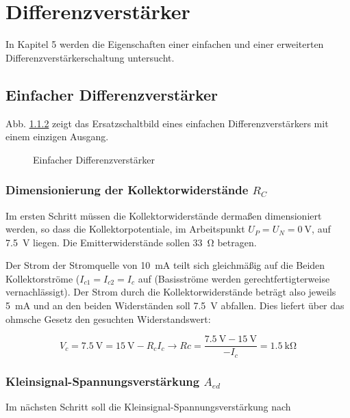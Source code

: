 \def\figpath{tex/5_Differenzverstaerker/pictures}
\graphicspath{{tex/5_Differenzverstaerker/pictures/}}

\chapter{Differenzverstärker}
In Kapitel 5 werden die Eigenschaften einer einfachen und einer erweiterten Differenzverstärkerschaltung untersucht.

\section{Einfacher Differenzverstärker}
Abb. \ref{} zeigt das Ersatzschaltbild eines einfachen Differenzverstärkers mit einem einzigen Ausgang. 

\begin{figure}[H]
	\centering
	\def\svgwidth{0.7\textwidth}
	
	\caption{Einfacher Differenzverstärker} 
	\label{fig_Kap5_01:ESBDiffVerst} 
\end{figure}

\subsection{Dimensionierung der Kollektorwiderstände $R_C$}

Im ersten Schritt müssen die Kollektorwiderstände dermaßen dimensioniert werden, so dass die Kollektorpotentiale, im Arbeitspunkt $U_P = U_N = \SI{0}{\volt}$, auf \SI{7.5}{\volt} liegen. Die Emitterwiderstände sollen \SI{33}{\ohm} betragen.

Der Strom der Stromquelle von \SI{10}{\milli \ampere} teilt sich gleichmäßig auf die Beiden Kollektorströme ($I_{c1} = I_{c2} = I_c$ auf (Basisströme werden gerechtfertigterweise vernachlässigt). Der Strom durch die Kollektorwiderstände beträgt also jeweils \SI{5}{\milli \ampere} und an den beiden Widerständen soll \SI{7.5}{\volt} abfallen. Dies liefert über das ohmsche Gesetz den gesuchten Widerstandswert:

\begin{equation}
    V_c = \SI{7.5}{\volt} = \SI{15}{\volt} - R_c I_c \rightarrow Rc = \frac{\SI{7.5}{\volt} - \SI{15}{\volt}}{- I_c} = \SI{1.5}{\kilo \ohm}
\end{equation}

\subsection{Kleinsignal-Spannungsverstärkung $A_{ed}$}
Im nächsten Schritt soll die Kleinsignal-Spannungsverstärkung nach

